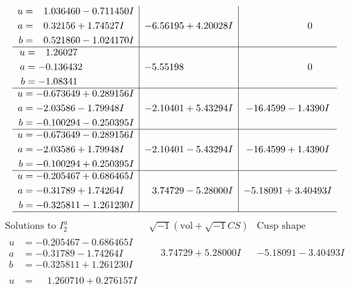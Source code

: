 \documentclass[1p]{elsarticle_modified}
\theoremstyle{definition}
\newcommand{\I}{\sqrt{-1}}
\begin{document}
$$\begin{array}{c|c|c}
\begin{aligned}
u &= \phantom{-}1.036460 - 0.711450 I \\
a &= \phantom{-}0.32156 + 1.74527 I \\
b &= \phantom{-}0.521860 - 1.024170 I\end{aligned}
 & -6.56195 + 4.20028 I & \phantom{-0.000000 } 0 \\ \hline\begin{aligned}
u &= \phantom{-}1.26027\phantom{ +0.000000I} \\
a &= -0.136432\phantom{ +0.000000I} \\
b &= -1.08341\phantom{ +0.000000I}\end{aligned}
 & -5.55198\phantom{ +0.000000I} & \phantom{-0.000000 } 0 \\ \hline\begin{aligned}
u &= -0.673649 + 0.289156 I \\
a &= -2.03586 - 1.79948 I \\
b &= -0.100294 - 0.250395 I\end{aligned}
 & -2.10401 + 5.43294 I & -16.4599 - 1.4390 I \\ \hline\begin{aligned}
u &= -0.673649 - 0.289156 I \\
a &= -2.03586 + 1.79948 I \\
b &= -0.100294 + 0.250395 I\end{aligned}
 & -2.10401 - 5.43294 I & -16.4599 + 1.4390 I \\ \hline\begin{aligned}
u &= -0.205467 + 0.686465 I \\
a &= -0.31789 + 1.74264 I \\
b &= -0.325811 - 1.261230 I\end{aligned}
 & \phantom{-}3.74729 - 5.28000 I & -5.18091 + 3.40493 I\\
 \hline 
 \end{array}$$\newpage$$\begin{array}{c|c|c}  
\text{Solutions to }I^u_{2}& \I (\text{vol} + \sqrt{-1}CS) & \text{Cusp shape}\\
 \hline 
\begin{aligned}
u &= -0.205467 - 0.686465 I \\
a &= -0.31789 - 1.74264 I \\
b &= -0.325811 + 1.261230 I\end{aligned}
 & \phantom{-}3.74729 + 5.28000 I & -5.18091 - 3.40493 I \\ \hline\begin{aligned}
u &= \phantom{-}1.260710 + 0.276157 I \\

\end{aligned}
\end{array}$$
\end{document}
